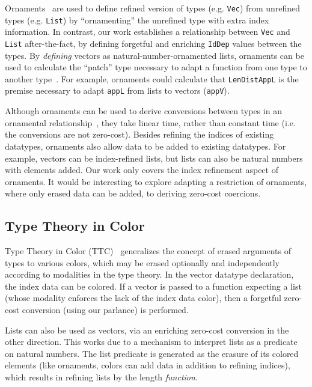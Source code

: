 \documentclass[acmsmall,screen]{acmart}
\begin{document}
Ornaments~\cite{ornaments:original} are used to define refined
version of types (e.g. \texttt{Vec}) from unrefined types
(e.g. \texttt{List}) by ``ornamenting'' the unrefined type with extra
index information. In contrast, our work establishes a relationship
between \texttt{Vec} and \texttt{List} after-the-fact, by defining
forgetful and enriching \verb;IdDep; values between the types.
By \textit{defining} vectors as natural-number-ornamented lists,
ornaments can be used to calculate the ``patch'' type necessary to adapt a
function from one type to another type~\cite{ornaments:functional}.
For example, ornaments could
calculate that \texttt{LenDistAppL} is the premise necessary to adapt
\texttt{appL} from lists to vectors (\texttt{appV}).

Although ornaments can be used to derive conversions between
types in an ornamental
relationship~\cite{ornaments:original,ornaments:relational},
they take linear time, rather than constant time (i.e. the conversions
are not zero-cost).
Besides refining the indices of existing datatypes, ornaments
also allow data to be added to existing datatypes. For example, vectors can
be index-refined lists, but lists can also be natural numbers with
elements added. Our work only covers the index refinement aspect of
ornaments. It would be interesting to explore adapting a
restriction of ornaments, where only erased data can be added,
to deriving zero-cost coercions.

\subsection{Type Theory in Color}

Type Theory in Color (TTC)~\cite{bernardy:color}
generalizes the concept of erased arguments
of types to various colors, which may be erased optionally and
independently according to modalities in the type theory. In the vector
datatype declaration, the index data can be colored. If a vector is
passed to a function expecting a list (whose modality enforces the
lack of the index data color), then a forgetful zero-cost conversion
(using our parlance) is performed.

Lists can also be used as vectors, via an enriching zero-cost
conversion in the other direction. This works due to a mechanism to
interpret lists as a predicate on natural numbers. The list predicate is
generated as the erasure of its colored elements (like ornaments,
colors can add data in addition to refining indices), which results in
refining lists by the length \textit{function}.
\end{document}
